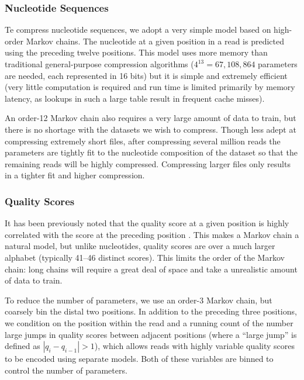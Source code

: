 \documentclass[a4,center,fleqn]{NAR}
\begin{document}
\subsubsection{Nucleotide Sequences}

Te compress nucleotide sequences, we adopt a very simple model based on high-order
Markov chains. The nucleotide at a given position in a read is predicted
using the preceding twelve positions. This model uses more memory than
traditional general-purpose compression algorithms ($4^{13} = 67,108,864$
parameters are needed, each represented in 16 bits)  but it is simple and
extremely efficient (very little computation is required and run time is
limited primarily by memory latency, as lookups in such a large table result
in frequent cache misses).

An order-12 Markov chain also requires a very large amount of
data to train, but there is no shortage with the datasets we wish to
compress. Though less adept at compressing extremely short files,
after compressing several million reads the parameters are tightly
fit to the nucleotide composition of the dataset so that the remaining reads
will be highly compressed. Compressing larger files only results in a tighter
fit and higher compression.


\subsubsection{Quality Scores}

It has been previously noted that the quality score at a given position is
highly correlated with the score at the preceding position
\citep{Kozanitis2011}. This makes a Markov chain a natural model, but unlike
nucleotides, quality scores are over a much larger alphabet (typically 41--46
distinct scores). This limits the order of the Markov chain: long chains will
require a great deal of space and take a unrealistic amount of data to train.

To reduce the number of parameters, we use an order-3 Markov chain, but
coarsely bin the distal two positions. In addition to the preceding three
positions, we condition on the position within the read and a running count of
the number large jumps in quality scores between adjacent positions (where
a ``large jump'' is defined as $|q_{i} - q_{i-1}| > 1$), which allows reads
with highly variable quality scores to be encoded using separate models. Both
of these variables are binned to control the number of parameters.
\end{document}
